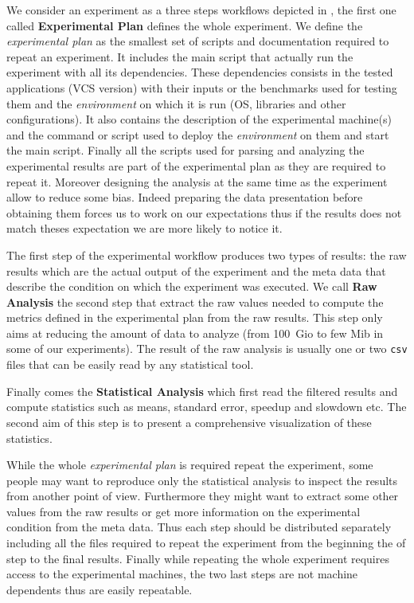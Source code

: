 We consider an experiment as a three steps workflows depicted in , the first one called \textbf{Experimental Plan} defines the whole experiment.
We define the \emph{experimental plan} as the smallest set of scripts and documentation required to repeat an experiment.
It includes the main script that actually run the experiment with all its dependencies.
These dependencies consists in the tested applications (\gls{VCS} version) with their inputs or the benchmarks used for testing them and the \emph{environment} on which it is run (\gls{OS}, libraries and other configurations).
It also contains the description of the experimental machine(s) and the command or script used to deploy the \emph{environment} on them and start the main script.
Finally all the scripts used for parsing and analyzing the experimental results are part of the experimental plan as they are required to repeat it.
Moreover designing the analysis at the same time as the experiment allow to reduce some bias.
Indeed preparing the data presentation before obtaining them forces us to work on our expectations thus if the results does not match theses expectation we are more likely to notice it.

The first step of the experimental workflow produces two types of results: the raw results which are the actual output of the experiment and the meta data that describe the condition on which the experiment was executed.
We call \textbf{Raw Analysis} the second step that extract the raw values needed to compute the metrics defined in the experimental plan from the raw results.
This step only aims at reducing the amount of data to analyze (from \SI{100}{Gio} to few Mib in some of our experiments).
The result of the raw analysis is usually one or two \texttt{csv} files that can be easily read by any statistical tool.

Finally comes the \textbf{Statistical Analysis} which first read the filtered results and compute statistics such as means, standard error, speedup and slowdown etc.
The second aim of this step is to present a comprehensive visualization of these statistics.

While the whole \emph{experimental plan} is required repeat the experiment, some people may want to reproduce only the statistical analysis to inspect the results from another point of view.
Furthermore they might want to extract some other values from the raw results or get more information on the experimental condition from the meta data.
Thus each step should be distributed separately including all the files required to repeat the experiment from the beginning the of step to the final results.
Finally while repeating the whole experiment requires access to the experimental machines, the two last steps are not machine dependents thus are easily repeatable.

